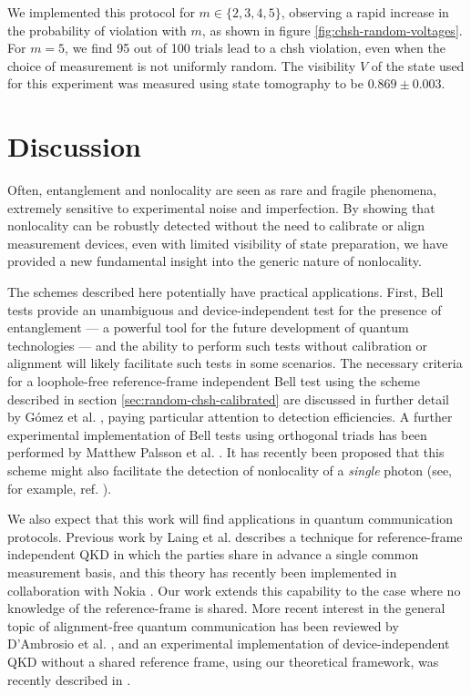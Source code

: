 We implemented this protocol for $m \in \{2,3,4,5\}$, observing a rapid increase in the probability of violation with $m$, as shown in figure \ref{fig:chsh-random-voltages}.  For $m=5$, we find 95 out of 100 trials lead to a \gls{chsh} violation, even when the choice of measurement is not uniformly random.  The visibility $V$ of the state used for this experiment was measured using state tomography to be $0.869\pm0.003$.

\section{Discussion} 
Often, entanglement and nonlocality are seen as rare and fragile phenomena, extremely sensitive to experimental noise and imperfection. By showing that nonlocality can be robustly detected without the need to calibrate or align measurement devices, even with limited visibility of state preparation, we have provided a new fundamental insight into the generic nature of nonlocality.

The schemes described here potentially have practical applications. First, Bell tests provide an unambiguous and device-independent test for the presence of entanglement --- a powerful tool for the future development of quantum technologies --- and the ability to perform such tests without calibration or alignment will likely facilitate such tests in some scenarios. The necessary criteria for a loophole-free reference-frame independent Bell test using the scheme described in section \ref{sec:random-chsh-calibrated} are discussed in further detail by G\'omez et al. \cite{Gomez2013}, paying particular attention to detection efficiencies. A further experimental implementation of Bell tests using orthogonal triads has been performed by Matthew Palsson et al. \cite{Palsson2012}. It has recently been proposed \cite{Brask2013} that this scheme might also facilitate the detection of nonlocality of a \emph{single} photon (see, for example, ref. \cite{Tan1991a}).

We also expect that this work will find applications in quantum communication protocols.
Previous work by Laing et al. \cite{Laing2010} describes a technique for reference-frame independent QKD in which the parties share in advance a single common measurement basis, and this theory has recently been implemented in collaboration with Nokia \cite{Zhang2013, Wabnig2013}. Our work extends this capability to the case where no knowledge of the reference-frame is shared.  More recent interest in the general topic of alignment-free quantum communication has been reviewed by D'Ambrosio et al. \cite{DAmbrosio2012}, and an experimental implementation of device-independent QKD without a shared reference frame, using our theoretical framework, was recently described in \cite{Slater2013}.

